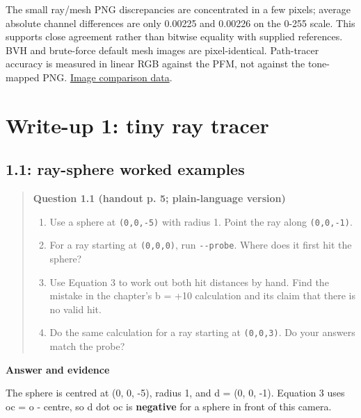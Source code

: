 \documentclass[11pt,a4paper]{article}
\begin{document}
The small ray/\allowbreak{}mesh PNG discrepancies are concentrated in a few pixels; average absolute channel differences are only 0.00225 and 0.00226 on the 0-255 scale. This supports close agreement rather than bitwise equality with supplied references. BVH and brute-force default mesh images are pixel-identical. Path-tracer accuracy is measured in linear RGB against the PFM, not against the tone-mapped PNG. \href{https://github.com/Champy2005/Lab09-RayTracing/blob/main/evidence/data/image-comparisons.json}{Image comparison data}.


\section{Write-up 1: tiny ray tracer}
\subsection*{1.1: ray-sphere worked examples}
\begin{quote}\small
\textbf{Question 1.1 (handout p. 5; plain-language version)}


\begin{enumerate}
\item Use a sphere at \texttt{(0,0,-5)} with radius 1. Point the ray along \texttt{(0,0,-1)}.
\item For a ray starting at \texttt{(0,0,0)}, run \texttt{-{}-probe}. Where does it first hit the sphere?
\item Use Equation 3 to work out both hit distances by hand. Find the mistake in the chapter's b = +10 calculation and its claim that there is no valid hit.
\item Do the same calculation for a ray starting at \texttt{(0,0,3)}. Do your answers match the probe?
\end{enumerate}\end{quote}
\textbf{Answer and evidence}


The sphere is centred at (0, 0, -5), radius 1, and d = (0, 0, -1). Equation 3 uses oc = o - centre, so d dot oc is \textbf{negative} for a sphere in front of this camera.
\end{document}
